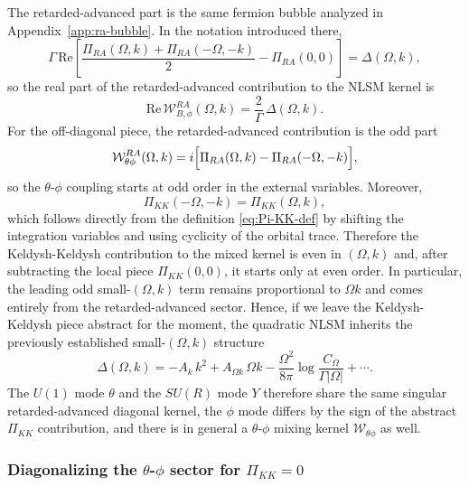 \documentclass[aps,prx,preprint,amsmath,amssymb]{revtex4-2}
\renewcommand{\Re}{\text{Re}}
\begin{document}
The retarded-advanced part is the same fermion bubble analyzed in
Appendix~\ref{app:ra-bubble}.  In the notation introduced there,
\begin{equation}\label{eq:Delta-to-W}
\Gamma\,\Re\!\left[
\frac{\Pi_{RA}(\Omega,k)+\Pi_{RA}(-\Omega,-k)}{2}-\Pi_{RA}(0,0)
\right]
=
\Delta(\Omega,k),
\end{equation}
so the real part of the retarded-advanced contribution to the NLSM kernel is
\begin{equation}\label{eq:W-RA-real}
\Re\,\mathcal W_{B,\phi}^{RA}(\Omega,k)=\frac{2}{\Gamma}\,\Delta(\Omega,k).
\end{equation}
For the off-diagonal piece, the retarded-advanced contribution is the odd part
\begin{equation}\label{eq:W-RA-mixed}
\mathcal W_{\theta\phi}^{RA}(\Omega,k)
=
i\Bigl[\Pi_{RA}(\Omega,k)-\Pi_{RA}(-\Omega,-k)\Bigr],
\end{equation}
so the \(\theta\)-\(\phi\) coupling starts at odd order in the external
variables.  Moreover,
\begin{equation}\label{eq:PiKK-even}
\Pi_{KK}(-\Omega,-k)=\Pi_{KK}(\Omega,k),
\end{equation}
which follows directly from the definition \eqref{eq:Pi-KK-def} by shifting the
integration variables and using cyclicity of the orbital trace.  Therefore the
Keldysh-Keldysh contribution to the mixed kernel is even in \((\Omega,k)\) and,
after subtracting the local piece \(\Pi_{KK}(0,0)\), it starts only at even
order.  In particular, the leading odd small-\((\Omega,k)\) term remains
proportional to \(\Omega k\) and comes entirely from the retarded-advanced
sector.
Hence, if we leave the Keldysh-Keldysh piece abstract for the moment, the
quadratic NLSM inherits the previously established small-\((\Omega,k)\) structure
\begin{equation}\label{eq:nlsm-small-structure}
\Delta(\Omega,k)
=
-A_k\,k^2
+A_{\Omega k}\,\Omega k
-\frac{\Omega^2}{8\pi}\log\!\frac{C_\Omega}{\Gamma|\Omega|}
+\cdots.
\end{equation}
The \(U(1)\) mode \(\theta\) and the \(SU(R)\) mode \(Y\) therefore share the
same singular retarded-advanced diagonal kernel, the \(\phi\) mode differs by
the sign of the abstract \(\Pi_{KK}\) contribution, and there is in general a
\(\theta\)-\(\phi\) mixing kernel \(\mathcal W_{\theta\phi}\) as well.

\subsubsection{Diagonalizing the \(\theta\)-\(\phi\) sector for \(\Pi_{KK}=0\)}
\end{document}
